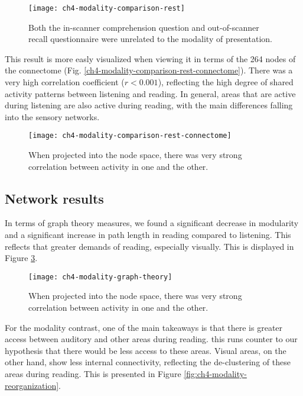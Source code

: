 \begin{figure}[t]
	\centering
	\texttt{[image: ch4-modality-comparison-rest]}
    \caption[Large overlap between listening and reading activation.]{Both the in-scanner comprehension question and out-of-scanner recall questionnaire were unrelated to the modality of presentation.}
	\label{fig:ch4-modality-comparison-rest}
\end{figure}

This result is more easly visualized when viewing it in terms of the 264 nodes of the connectome (Fig. \ref{ch4-modality-comparison-rest-connectome}). There was a very high correlation coefficient ($r < 0.001$), reflecting the high degree of shared activity patterns between listening and reading. In general, areas that are active during listening are also active during reading, with the main differences falling into the sensory networks. 

\begin{figure}[t]
	\centering
	\texttt{[image: ch4-modality-comparison-rest-connectome]}
    \caption[Large overlap between listening and reading activation in the connectome space.]{When projected into the node space, there was very strong correlation between activity in one and the other.}
	\label{fig:ch4-modality-comparison-rest-connectome}
\end{figure}

\subsection{Network results}

In terms of graph theory measures, we found a significant decrease in modularity and a significant increase in path length in reading compared to listening. This reflects that greater demands of reading, especially visually. This is displayed in Figure \ref{fig:ch4-modality-graph-theory}.

\begin{figure}[t]
	\centering
	\texttt{[image: ch4-modality-graph-theory]}
    \caption[Large overlap between listening and reading activation in the connectome space.]{When projected into the node space, there was very strong correlation between activity in one and the other.}
	\label{fig:ch4-modality-graph-theory}
\end{figure}

For the modality contrast, one of the main takeaways is that there is greater access between auditory and other areas during reading. this runs counter to our hypothesis that there would be less access to these areas. Visual areas, on the other hand, show less internal connectivity, reflecting the de-clustering of these areas during reading. This is presented in Figure \ref{fig:ch4-modality-reorganization}.

